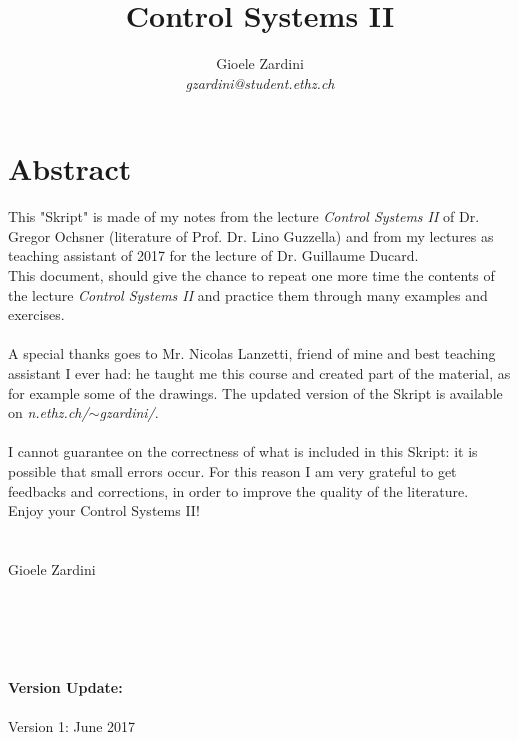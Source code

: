 \documentclass[a4paper,12 pt]{article}
\numberwithin{equation}{section}
\theoremstyle{definition}
\theoremstyle{remark}
\theoremstyle{definition}
\theoremstyle{definition}
\theoremstyle{definition}
\theoremstyle{remark}
\begin{document}
\title{\Huge \textbf{Control Systems II}} %
\author{Gioele Zardini \\ \emph{gzardini@student.ethz.ch}}


\maketitle

\newpage
\section*{Abstract} %

This "Skript" is made of my notes from the lecture \textit{Control Systems II} of Dr. Gregor Ochsner (literature of Prof. Dr. Lino Guzzella) and from my lectures as teaching assistant of 2017 for the lecture of Dr. Guillaume Ducard. \\
This document, should give the chance to repeat one more time the contents of the lecture \textit{Control Systems II} and practice them through many examples and exercises. \\ \\
A special thanks goes to Mr. Nicolas Lanzetti, friend of mine and best teaching assistant I ever had: he taught me this course and created part of the material, as for example some of the drawings.
The updated version of the Skript is available on \emph{n.ethz.ch/$\sim$gzardini/}. \\ \\
I cannot guarantee on the correctness of what is included in this Skript: it is possible that small errors occur. For this reason I am very grateful to get feedbacks and corrections, in order to improve the quality of the literature. \\
Enjoy your Control Systems II!
\\\\\\
Gioele Zardini
\\
\\
\\
\\
\\
\\
\textbf{Version Update:}\\ \\
Version 1: June 2017



\newpage
\tableofcontents %
\end{document}

